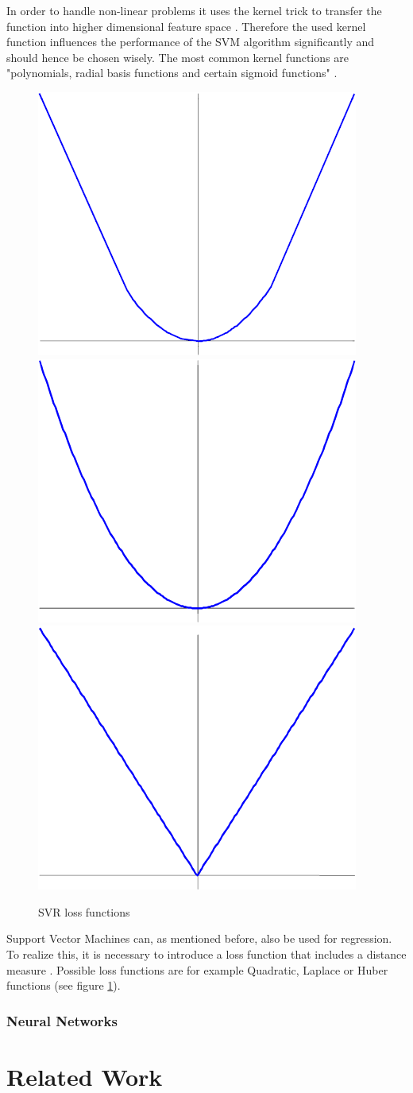 \documentclass[
	english,
	ruledheaders=section,%
	class=report,%
	thesis={type=master},%
	accentcolor=8c,%
	custommargins=true,%
	marginpar=false,%
	parskip=half-,%
	fontsize=11pt,%
]{tudapub}
\begin{document}
In order to handle non-linear problems it uses the kernel trick to transfer the function into higher dimensional feature space \cite{gunn1998support}. Therefore the used kernel function influences the performance of the SVM algorithm significantly and should hence be chosen wisely. The most common kernel functions are "polynomials, radial basis functions and certain
sigmoid functions" \cite{gunn1998support}.\\
\begin{figure}[hp]
\centering
\includegraphics[width=.25\textwidth]{data/basics/svr1.png}\hfill
\includegraphics[width=.25\textwidth]{data/basics/svr2.png}\hfill
\includegraphics[width=.25\textwidth]{data/basics/svr3.png}
\caption{SVR loss functions \cite{gunn1998support}}
\label{fig:svr}
\end{figure}
Support Vector Machines can, as mentioned before, also be used for regression. To realize this, it is necessary to introduce a loss function that includes a distance measure \cite{gunn1998support}. Possible loss functions are for example Quadratic, Laplace or Huber functions (see figure \ref{fig:svr}).
\subsection{Neural Networks}
\newpage
\chapter{Related Work}
\newpage
\end{document}
